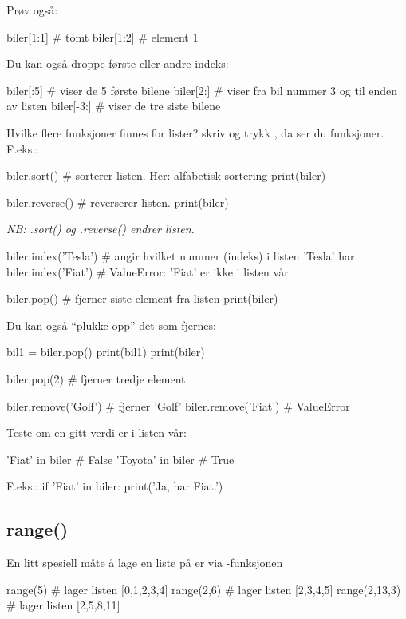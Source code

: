 Prøv også:
\begin{usncodebox}
biler[1:1]   # tomt
biler[1:2]   # element 1
\end{usncodebox}

Du kan også droppe første eller andre indeks:
\begin{usncodebox}
biler[:5]     # viser de 5 første bilene
biler[2:]     # viser fra bil nummer 3 og til enden av listen
biler[-3:]    # viser de tre siste bilene
\end{usncodebox}

Hvilke flere funksjoner finnes for lister? skriv  og trykk , da ser du funksjoner. F.eks.:

\begin{usncodebox}
biler.sort()          # sorterer listen. Her: alfabetisk sortering
print(biler)

biler.reverse()       # reverserer listen. 
print(biler)
\end{usncodebox}

\emph{NB: .sort() og .reverse() endrer listen.}

\begin{usncodebox}
biler.index('Tesla')  # angir hvilket nummer (indeks) i listen 'Tesla' har 
biler.index('Fiat')   # ValueError: 'Fiat' er ikke i listen vår 

biler.pop()           # fjerner siste element fra listen
print(biler)
\end{usncodebox}

Du kan også ``plukke opp'' det som fjernes:
\begin{usncodebox}
bil1 = biler.pop()
print(bil1)
print(biler)

biler.pop(2)          # fjerner tredje element 

biler.remove('Golf')  # fjerner 'Golf'
biler.remove('Fiat')  # ValueError
\end{usncodebox}

Teste om en gitt verdi er i listen vår:
\begin{usncodebox}
'Fiat' in biler       # False
'Toyota' in biler     # True
\end{usncodebox}

F.eks.:
if 'Fiat' in biler:
   print('Ja, har Fiat.')

\subsection{range()}

En litt spesiell måte å lage en liste på er via -funksjonen
\begin{usncodebox}
range(5)        # lager listen [0,1,2,3,4]  
range(2,6)      # lager listen [2,3,4,5]
range(2,13,3)   # lager listen [2,5,8,11]
\end{usncodebox}

